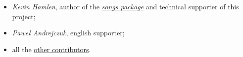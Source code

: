 \begin{itemize}
	\item {\textit{\rmfamily Kevin Hamlen}}, author of the \href{http://songs.sourceforge.net/}{\textit{songs package}} and technical supporter of this project;
	\item {\textit{\rmfamily Paweł Andrejczuk}}, english supporter;
  \item all the \href{https://github.com/PietroPrandini/GuitarHub/graphs/contributors}{other contributors}.
\end{itemize}
